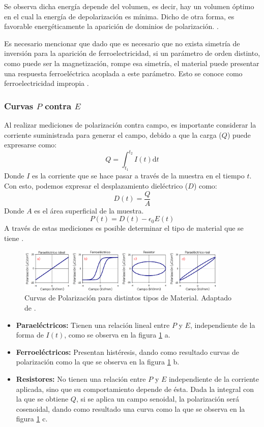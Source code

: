 \documentclass[../main.tex]{subfiles}
\begin{document}
Se observa dicha energía depende del volumen, es decir, hay un volumen óptimo en el cual la energía de depolarización es mínima. Dicho de otra forma, es favorable energéticamente la aparición de dominios de polarización. \cite{Landau1984}.

Es necesario mencionar que dado que es necesario que no exista simetría de inversión para la aparición de ferroelectricidad, si un parámetro de orden distinto, como puede ser la magnetización, rompe esa simetría, el material puede presentar una respuesta ferroeléctrica acoplada a este parámetro. Esto se conoce como ferroelectricidad impropia \cite{Levanyuk1974}.
\subsubsection{Curvas \texorpdfstring{$P$}{P} contra \texorpdfstring{$E$}{E}} \label{sec:PEarte}
Al realizar mediciones de polarización contra campo, es importante considerar la corriente suministrada para generar el campo, debido a que la carga ($Q$) puede expresarse como:
\begin{equation}
    Q=\int_{t_1}^{t_2}I(t)\text{d}t
    \label{eq:cargaintensidad}
\end{equation}
Donde $I$ es la corriente que se hace pasar a través de la muestra en el tiempo $t$.
Con esto, podemos expresar el desplazamiento dieléctrico ($D$) como:
\begin{equation}
    D(t)=\dfrac{Q}{A}
    \label{eq:despdielec}
\end{equation}
Donde $A$ es el área superficial de la muestra.
\begin{equation}
    P(t)=D(t)-\epsilon_0E(t)
    \label{eq:polarizacionec}
\end{equation}
A través de estas mediciones es posible determinar el tipo de material que se tiene \cite{Stewart1999}.
\begin{figure}[H]
    \centering
    \includegraphics[width=0.9\textwidth]{fig/PEloop.png}
    \caption{Curvas de Polarización para distintos tipos de Material. Adaptado de \cite{Stewart1999}.}
    \label{fig:PEloop}
\end{figure}
\begin{itemize}
  \item \textbf{Paraeléctricos:} Tienen una relación lineal entre $P$ y $E$, independiente de la forma de $I(t)$, como se observa en la figura \ref{fig:PEloop} a.
  \item \textbf{Ferroeléctricos:} Presentan histéresis, dando como resultado curvas de polarización como la que se observa en la figura \ref{fig:PEloop} b.
  \item \textbf{Resistores:} No tienen una relación entre $P$ y $E$ independiente de la corriente aplicada, sino que su comportamiento depende de ésta. Dada la integral con la que se obtiene $Q$, si se aplica un campo senoidal, la polarización será cosenoidal, dando como resultado una curva como la que se observa en la figura \ref{fig:PEloop} c.
\end{itemize}
\end{document}
